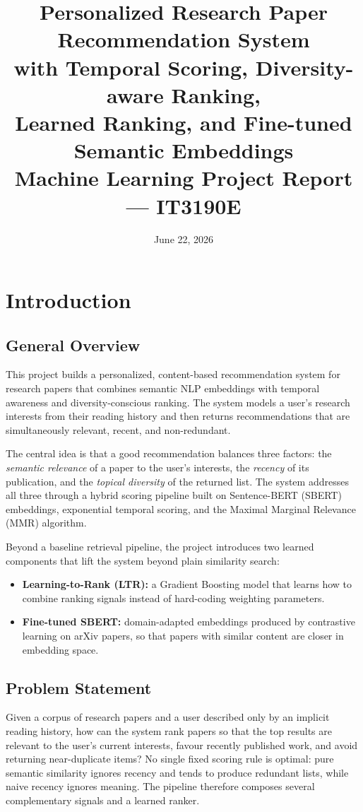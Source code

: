 \documentclass[12pt,a4paper]{article}
\title{\bfseries Personalized Research Paper Recommendation System\\[6pt]
\large with Temporal Scoring, Diversity-aware Ranking,\\
Learned Ranking, and Fine-tuned Semantic Embeddings\\[10pt]
\normalsize Machine Learning Project Report --- IT3190E}
\author{}
\date{June 22, 2026}
\begin{document}
\maketitle
\thispagestyle{empty}

\section{Introduction}

\subsection{General Overview}
This project builds a personalized, content-based recommendation system for
research papers that combines semantic NLP embeddings with temporal awareness
and diversity-conscious ranking. The system models a user's research interests
from their reading history and then returns recommendations that are
simultaneously relevant, recent, and non-redundant.

The central idea is that a good recommendation balances three factors: the
\emph{semantic relevance} of a paper to the user's interests, the
\emph{recency} of its publication, and the \emph{topical diversity} of the
returned list. The system addresses all three through a hybrid scoring
pipeline built on Sentence-BERT (SBERT) embeddings, exponential temporal
scoring, and the Maximal Marginal Relevance (MMR) algorithm.

Beyond a baseline retrieval pipeline, the project introduces two learned
components that lift the system beyond plain similarity search:
\begin{itemize}[leftmargin=1.4em]
  \item \textbf{Learning-to-Rank (LTR):} a Gradient Boosting model that learns
  how to combine ranking signals instead of hard-coding weighting parameters.
  \item \textbf{Fine-tuned SBERT:} domain-adapted embeddings produced by
  contrastive learning on arXiv papers, so that papers with similar content
  are closer in embedding space.
\end{itemize}

\subsection{Problem Statement}
Given a corpus of research papers and a user described only by an implicit
reading history, how can the system rank papers so that the top results are
relevant to the user's current interests, favour recently published work, and
avoid returning near-duplicate items? No single fixed scoring rule is optimal:
pure semantic similarity ignores recency and tends to produce redundant lists,
while naive recency ignores meaning. The pipeline therefore composes several
complementary signals and a learned ranker.
\end{document}

